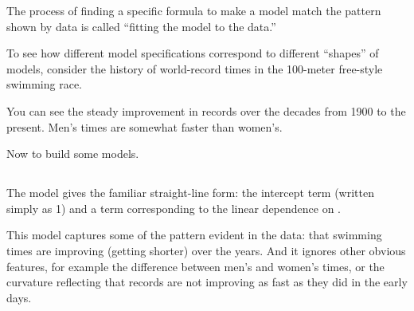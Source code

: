 The process of finding a specific formula to make a model match the
pattern shown by data is called ``fitting the model to the data.''  

To see how different model specifications correspond to different
``shapes'' of models, consider the history of world-record times in the 100-meter 
free-style swimming race.








\begin{knitrout}
\end{knitrout}




You can see the steady improvement in records over the decades from
1900 to the present.  Men's times are somewhat faster than women's.

Now to build some models.

\subsection{}

The model  gives the familiar
straight-line form: the intercept term (written simply as 1) and a term corresponding to the
linear dependence on .





\begin{knitrout}
\end{knitrout}


This model captures some of the pattern evident in the data: that
swimming times are improving (getting shorter) over the years.  And it
ignores other obvious features, for example the difference between men's
and women's times, or the curvature reflecting that records are not
improving as fast as they did in the early days.


